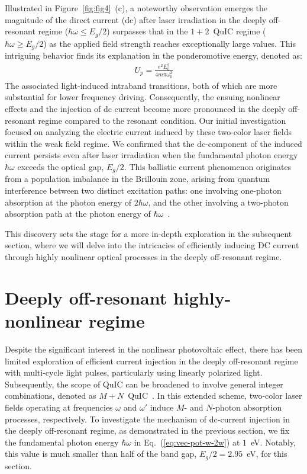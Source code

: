  Illustrated in Figure~\ref{fig:fig4}~(c), a noteworthy observation emerges the magnitude of the direct current (dc) after laser irradiation in the deeply off-resonant regime ($\hbar \omega \le E_g/2$) surpasses that in the $1+2$~\gls{QuIC} regime ($\hbar \omega \ge E_g/2$) as the applied field strength reaches exceptionally large values. This intriguing behavior finds its explanation in the ponderomotive energy, denoted as:
 \begin{align}
 U_p=\frac{e^2E^2_0}{4m\pi \omega_0^2}    
 \end{align}
 The associated light-induced intraband transitions, both of which are more substantial for lower frequency driving\cite{PhysRevB.98.035202}. Consequently, the ensuing nonlinear effects and the injection of dc current become more pronounced in the deeply off-resonant regime compared to the resonant condition. 
Our initial investigation focused on analyzing the electric current induced by these two-color laser fields within the weak field regime. We confirmed that the dc-component of the induced current persists even after laser irradiation when the fundamental photon energy $\hbar \omega$ exceeds the optical gap, $E_g/2$. This ballistic current phenomenon originates from a population imbalance in the Brillouin zone, arising from quantum interference between two distinct excitation paths: one involving one-photon absorption at the photon energy of $2\hbar \omega$, and the other involving a two-photon absorption path at the photon energy of $\hbar \omega$~\cite{PhysRevLett.74.3596,PhysRevLett.76.1703,PhysRevLett.78.306}.


 This discovery sets the stage for a more in-depth exploration in the subsequent section, where we will delve into the intricacies of efficiently inducing DC current through highly nonlinear optical processes in the deeply off-resonant regime.


\section{Deeply off-resonant highly-nonlinear regime \label{sec:nonperturbative}}

Despite the significant interest in the nonlinear photovoltaic effect, there has been limited exploration of efficient current injection in the deeply off-resonant regime with multi-cycle light pulses, particularly using linearly polarized light. Subsequently, the scope of \gls{QuIC} can be broadened to involve general integer combinations, denoted as $M+N$~\gls{QuIC}~\cite{PhysRevB.100.075202,PhysRevLett.123.067402}. In this extended scheme, two-color laser fields operating at frequencies $\omega$ and $\omega'$ induce $M$- and $N$-photon absorption processes, respectively.
To investigate the mechanism of dc-current injection in the deeply off-resonant regime, as demonstrated in the previous section, we fix the fundamental photon energy $\hbar \omega$ in Eq.~(\ref{eq:vec-pot-w-2w}) at $1$~eV. Notably, this value is much smaller than half of the band gap, $E_g/2=2.95$~eV, for this section.

